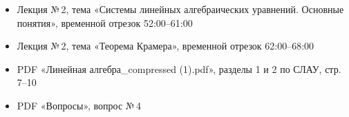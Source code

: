 \begin{tcolorbox}[title=Источники, colback=gray!10]
\begin{itemize}
  \item Лекция №\,2, тема «Системы линейных алгебраических уравнений. Основные понятия», временной отрезок 52:00--61:00
  \item Лекция №\,2, тема «Теорема Крамера», временной отрезок 62:00--68:00
  \item PDF «Линейная алгебра\_compressed (1).pdf», разделы 1 и 2 по СЛАУ, стр. 7--10
  \item PDF «Вопросы», вопрос №\,4
\end{itemize}
\end{tcolorbox}
